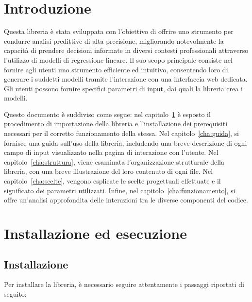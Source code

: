 \documentclass{rapportECL}
\begin{document}


        
\margins 
\mytitlepage
{}
\toc 
\fig



\cleardoublepage 

\chapter*{Introduzione}

Questa libreria è stata sviluppata con l'obiettivo di offrire uno strumento per condurre analisi predittive di alta precisione, 
migliorando notevolmente la capacità di prendere decisioni informate in diversi contesti professionali attraverso l'utilizzo 
di modelli di regressione lineare. 
Il suo scopo principale consiste nel fornire agli utenti uno strumento efficiente ed intuitivo, 
consentendo loro di generare i suddetti modelli tramite l'interazione con una interfaccia web dedicata.
Gli utenti possono fornire specifici parametri di input, dai quali la libreria crea i modelli.  

Questo documento è suddiviso come segue: nel capitolo~\ref{cha:import} è esposto il procedimento di importazione della libreria 
e l'installazione dei prerequisiti necessari per il corretto funzionamento della stessa. 
Nel capitolo~\ref{cha:guida}, si fornisce una guida sull'uso della libreria, includendo una breve descrizione di ogni campo di input visualizzato 
nella pagina di interazione con l'utente. Nel capitolo~\ref{cha:struttura}, viene esaminata l'organizzazione strutturale della libreria, 
con una breve illustrazione del loro contenuto di ogni file. Nel capitolo~\ref{cha:scelte}, vengono esplicate le scelte progettuali effettuate 
e il significato dei parametri utilizzati. Infine, nel capitolo~\ref{cha:funzionamento}, si offre un'analisi approfondita delle interazioni tra 
le diverse componenti del codice.

\chapter{Installazione ed esecuzione}
\label{cha:import}

\section*{Installazione}
Per installare la libreria, è necessario seguire attentamente i passaggi riportati di seguito:
\end{document}
